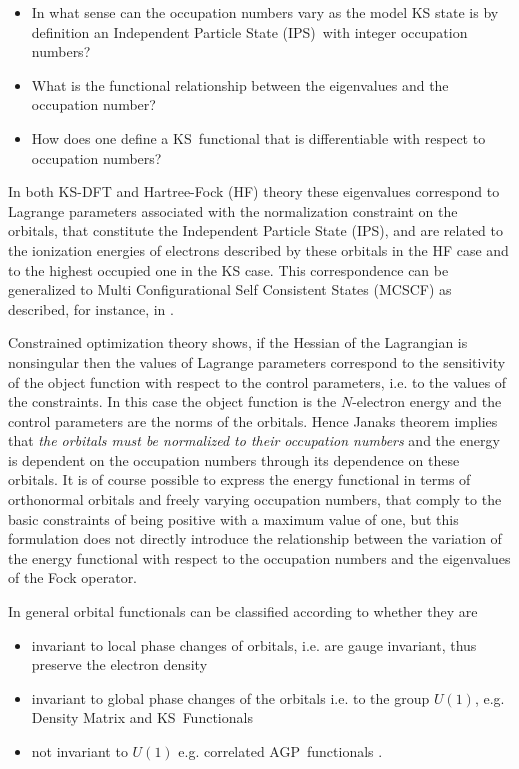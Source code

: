 \documentclass[aps,preprint]{revtex4}%
\begin{document}
\begin{itemize}
\item In what sense can the occupation numbers vary as the model KS state is
by definition an Independent Particle State (IPS)\ with integer occupation numbers?

\item What is the functional relationship between the eigenvalues and the
occupation number?

\item How does one define a KS\ functional that is differentiable with respect
to occupation numbers?
\end{itemize}

In both KS-DFT and Hartree-Fock (HF) theory these eigenvalues correspond to
Lagrange parameters associated with the normalization constraint on the
orbitals, that constitute the Independent Particle State (IPS), and are
related to the ionization energies of electrons described by\textit{ }these
orbitals in the HF case and to the highest occupied one in the KS case. This
correspondence can be generalized to Multi Configurational Self Consistent
States (MCSCF) as described, for instance, in \cite{OrtizWeiner2006}.

Constrained optimization theory \cite{Hestenes75} shows, if the Hessian of the
Lagrangian is nonsingular then the values of Lagrange parameters correspond to
the sensitivity of the object function with respect to the control parameters,
i.e. to the values of the constraints. In this case the object function is the
$N$-electron energy and the control parameters are the norms of the orbitals.
Hence Janaks theorem implies that\emph{ the orbitals must be normalized to
their occupation numbers }and the energy is dependent on the occupation
numbers through its dependence on these orbitals. It is of course possible to
express the energy functional in terms of orthonormal orbitals and freely
varying occupation numbers, that comply to the basic constraints of being
positive with a maximum value of one, but this formulation does not directly
introduce the relationship between the variation of the energy functional with
respect to the occupation numbers and the eigenvalues of the Fock operator.

In general orbital functionals can be classified according to whether they are

\begin{itemize}
\item invariant to local phase changes of orbitals, i.e. are gauge invariant,
thus preserve the electron density

\item invariant to global phase changes of the orbitals i.e. to the group
$U\left(  1\right)  $, e.g. Density Matrix and KS\ Functionals

\item not invariant to $U\left(  1\right)  $ e.g. correlated AGP\ functionals
\cite{OrtizWeiner2006}.
\end{itemize}
\end{document}
